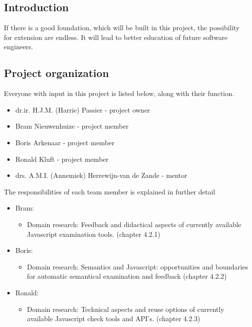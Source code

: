 \documentclass{article}
\begin{document}
\subsection{Introduction}

If there is a good foundation, which will be built in this project, the
possibility for extension are endless. It will lead to better education of
future software engineers.

\subsection{Project organization}
Everyone with input in this project is listed below, along with their function.
\begin{itemize}
  \item dr.ir. H.J.M. (Harrie) Passier - project owner
  \item Bram Nieuwenhuize - project member
  \item Boris Arkenaar - project member
  \item Ronald Kluft - project member
  \item drs. A.M.I. (Annemiek) Herrewijn-van de Zande - mentor
\end{itemize}
The responsibilities of each team member is explained in further detail
\begin{itemize}
  \item Bram: 
    \begin{itemize}
      \item Domain research: Feedback and didactical aspects of currently
        available Javascript examination tools. (chapter 4.2.1)
    \end{itemize}
  \item Boris:
    \begin{itemize}
      \item Domain research: Semantics and Javascript: opportunities and
        boundaries for automatic semantical examination and feedback (chapter
        4.2.2)
    \end{itemize}
  \item Ronald:
    \begin{itemize}
      \item Domain research: Technical aspects and reuse options of currently
        available Javascript check tools and API's. (chapter 4.2.3)
    \end{itemize}
\end{itemize}
\end{document}
